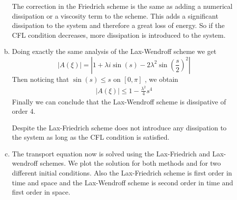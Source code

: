 \documentclass[10pt,a4paper,twoside, french]{article}
\numberwithin{equation}{section}
\numberwithin{figure}{section}
\numberwithin{table}{section}
\begin{document}
\begin{enumerate}
\begin{enumerate}[a.]
The correction in the Friedrich scheme is the same as adding a numerical dissipation or a viscosity term to the scheme. This adds a significant dissipation to the system and therefore a great loss of energy. So if the CFL condition decreases, more dissipation is introduced to the system.\\


\item Doing exactly the same analysis of the Lax-Wendroff scheme we get 
$$ |A(\xi)| = |1+\lambda i \sin(s) - 2\lambda^2 \sin(\frac{s}{2})^2 | $$
Then noticing that $ \sin(s)\leq s$ on $[0,\pi]$ , we obtain
\begin{align*}
|A(\xi)|  \leq 1-\frac{\lambda^2}{4} s^4 
\end{align*}
Finally we can conclude that the Lax-Wendroff scheme is dissipative of order 4.

Despite the Lax-Friedrich scheme does not introduce any dissipation to the system as long as the CFL condition is satisfied.

\item The transport equation now is solved using the Lax-Friedrich and Lax-wendroff schemes. We plot the solution for both methods and for two different initial conditions. Also the Lax-Friedrich scheme is first order in time and space and  the Lax-Wendroff scheme is second order in time and first order in space.


\end{enumerate}
\end{enumerate}
\end{document}
